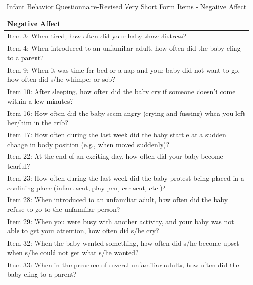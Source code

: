 \documentclass[
]{article}
\begin{document}
\begin{table}

\caption{\label{tab:unnamed-chunk-4}Infant Behavior Questionnaire-Revised Very Short Form Items - Negative Affect}
\fontsize{12}{14}\selectfont
\begin{tabular}[t]{>{\raggedright\arraybackslash}p{40em}}
\hline
\textbf{Negative Affect}\\
\hline
Item 3: When tired, how often did your baby show distress?\\
\hline
Item 4: When introduced to an unfamiliar adult, how often did the baby cling to a parent?\\
\hline
Item 9: When it was time for bed or a nap and your baby did not want to go, how often did s/he whimper or sob?\\
\hline
Item 10: After sleeping, how often did the baby cry if someone doesn’t come within a few minutes?\\
\hline
Item 16: How often did the baby seem angry (crying and fussing) when you left her/him in the crib?\\
\hline
Item 17: How often during the last week did the baby startle at a sudden change in body position (e.g., when moved suddenly)?\\
\hline
Item 22: At the end of an exciting day, how often did your baby become tearful?\\
\hline
Item 23: How often during the last week did the baby protest being placed in a confining place (infant seat, play pen, car seat, etc.)?\\
\hline
Item 28: When introduced to an unfamiliar adult, how often did the baby refuse to go to the unfamiliar person?\\
\hline
Item 29: When you were busy with another activity, and your baby was not able to get your attention, how often did s/he cry?\\
\hline
Item 32: When the baby wanted something, how often did s/he become upset when s/he could not get what s/he wanted?\\
\hline
Item 33: When in the presence of several unfamiliar adults, how often did the baby cling to a parent?\\
\hline
\end{tabular}
\end{table}

\hypertarget{section-2}{%
\section{}\label{section-2}}
\end{document}

